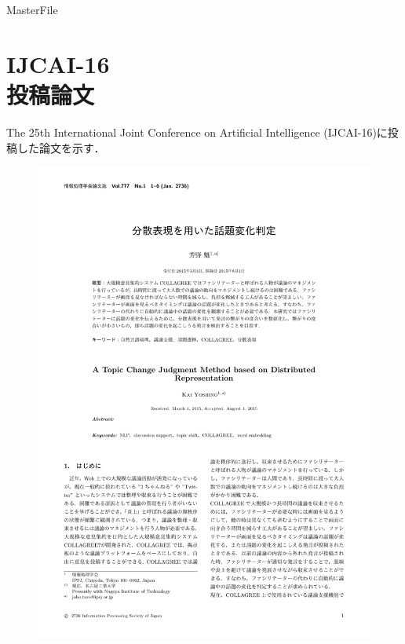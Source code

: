 \expandafter\ifx\csname MasterFile\endcsname\relax
\def\SubFile{hoge}


\fi
\cleardoublepage
\chapter[IJCAI-16投稿論文]{IJCAI-16\\投稿論文}
The 25th International Joint Conference on Artificial Intelligence (IJCAI-16)に投稿した論文を示す．
\begin{figure}
	\centering
	\includegraphics[width=\linewidth,page=1]{../C.IPSJ80/jsample-submit.pdf}
\end{figure}

